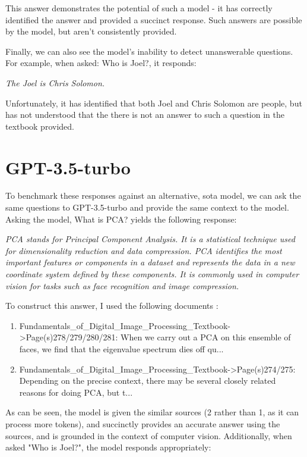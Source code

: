 \documentclass{article}
\newenvironment{itquote}
  {\begin{displayquote}\itshape}
  {\end{displayquote}\ignorespacesafterend}
\begin{document}
This answer demonstrates the potential of such a model - it has correctly identified the answer and provided a succinct response. Such answers are possible by the model, but aren't consistently provided.

Finally, we can also see the model's inability to detect unanswerable questions. For example, when asked: Who is Joel?, it responds:
\begin{itquote}
    The Joel is Chris Solomon.
\end{itquote}

Unfortunately, it has identified that both Joel and Chris Solomon are people, but has not understood that the there is not an answer to such a question in the textbook provided.

\section{GPT-3.5-turbo}
To benchmark these responses against an alternative, \acrfull{sota} model, we can ask the same questions to GPT-3.5-turbo and provide the same context to the model. Asking the model, What is PCA? yields the following response:
\begin{itquote}
    PCA stands for Principal Component Analysis. It is a statistical technique used for dimensionality reduction and data compression. PCA identifies the most important features or components in a dataset and represents the data in a new coordinate system defined by these components. It is commonly used in computer vision for tasks such as face recognition and image compression.
    
    To construct this answer, I used the following documents : 
       
    \begin{enumerate}
        \item Fundamentals\_of\_Digital\_Image\_Processing\_Textbook->Page(s)278/279/280/281:
    When we carry out a PCA on this ensemble of faces, we find that the eigenvalue spectrum
    dies off qu...
        \item Fundamentals\_of\_Digital\_Image\_Processing\_Textbook->Page(s)274/275:
    Depending on the precise context, there may be several closely related reasons for doing
    PCA, but t...
    \end{enumerate}
\end{itquote}

As can be seen, the model is given the similar sources (2 rather than 1, as it can process more tokens), and succinctly provides an accurate answer using the sources, and is grounded in the context of computer vision. Additionally, when asked "Who is Joel?", the model responds appropriately:
\end{document}
